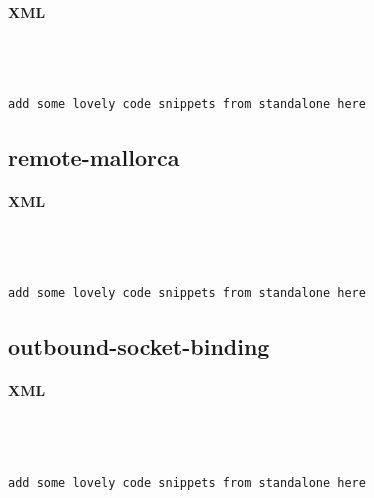 \documentclass[
10pt, %
letterpaper, %
oneside, %
headinclude,footinclude, %
BCOR5mm, %
]{scrartcl}
\begin{document}

\paragraph{XML}~
\begin{lstlisting}[language=XML]

add some lovely code snippets from standalone here

\end{lstlisting}


\subsection{remote-mallorca}


\paragraph{XML}~
\begin{lstlisting}[language=XML]

add some lovely code snippets from standalone here


\end{lstlisting}


\subsection{outbound-socket-binding}


\paragraph{XML}~
\begin{lstlisting}[language=XML]

add some lovely code snippets from standalone here

\end{lstlisting}




\end{document}

